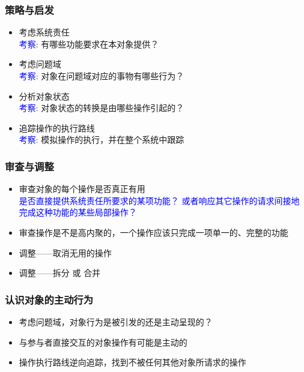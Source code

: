 \documentclass[compress]{beamer}
\begin{document}
\begin{frame}
  \frametitle{策略与启发}
  \begin{itemize}
    \item 考虑系统责任 \\
      \textcolor{blue}{考察}: 有哪些功能要求在本对象提供？
    \item 考虑问题域 \\
      \textcolor{blue}{考察}: 对象在问题域对应的事物有哪些行为？
    \item 分析对象状态 \\
      \textcolor{blue}{考察}: 对象状态的转换是由哪些操作引起的？
    \item 追踪操作的执行路线 \\
      \textcolor{blue}{考察}: 模拟操作的执行，并在整个系统中跟踪
  \end{itemize}
\end{frame}

\begin{frame}
  \frametitle{审查与调整}
  \begin{itemize}
    \item 审查对象的每个操作是否真正有用 \\
      \textcolor{blue}{是否直接提供系统责任所要求的某项功能？
      或者响应其它操作的请求间接地完成这种功能的某些局部操作？}
    \item 审查操作是不是高内聚的，一个操作应该只完成一项单一的、完整的功能
    \item 调整——取消无用的操作
    \item 调整——\alert{拆分} 或 \alert{合并}
  \end{itemize}

\end{frame}

\begin{frame}
  \frametitle{认识对象的主动行为}
  \begin{itemize}
    \item 考虑问题域，对象行为是被引发的还是主动呈现的？
    \item 与参与者直接交互的对象操作有可能是主动的
    \item 操作执行路线逆向追踪，找到不被任何其他对象所请求的操作
  \end{itemize}
\end{frame}
\end{document}
